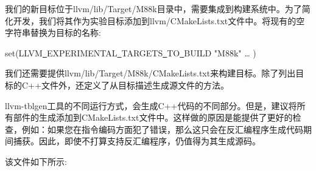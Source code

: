 我们的新目标位于llvm/lib/Target/M88k目录中，需要集成到构建系统中。为了简化开发，我们将其作为实验目标添加到llvm/CMakeLists.txt文件中。将现有的空字符串替换为目标的名称:\par

\begin{tcolorbox}[colback=white,colframe=black]
set(LLVM\underline{~}EXPERIMENTAL\underline{~}TARGETS\underline{~}TO\underline{~}BUILD "M88k" … )
\end{tcolorbox}

我们还需要提供llvm/lib/Target/M88k/CMakeLists.txt来构建目标。除了列出目标的C++文件外，还定义了从目标描述生成源文件的方法。\par

\begin{tcolorbox}[colback=blue!5!white,colframe=blue!75!black, title=从目标描述生成所有类型的源]
llvm-tblgen工具的不同运行方式，会生成C++代码的不同部分。但是，建议将所有部件的生成添加到CMakeLists.txt文件中。这样做的原因是能提供了更好的检查，例如：如果您在指令编码方面犯了错误，那么这只会在反汇编程序生成代码期间捕获。因此，即使不打算支持反汇编程序，仍值得为其生成源码。	
\end{tcolorbox}

该文件如下所示:\par

